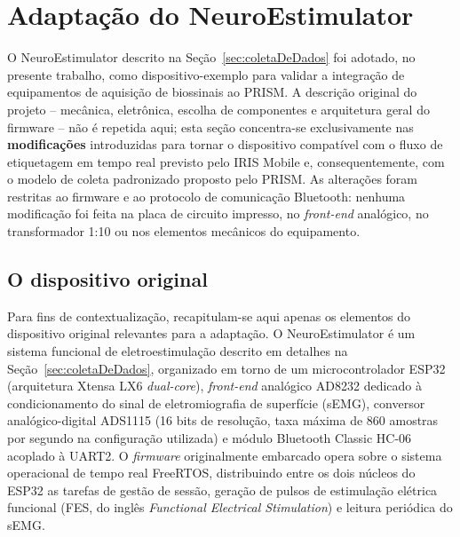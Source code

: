 %   

\section{Adaptação do NeuroEstimulator}\label{sec:adaptacaoNeuroEstimulator}

O NeuroEstimulator descrito na Seção~\ref{sec:coletaDeDados} foi adotado, no presente trabalho, como dispositivo-exemplo para validar a integração de equipamentos de aquisição de biossinais ao PRISM. A descrição original do projeto -- mecânica, eletrônica, escolha de componentes e arquitetura geral do firmware -- não é repetida aqui; esta seção concentra-se exclusivamente nas \textbf{modificações} introduzidas para tornar o dispositivo compatível com o fluxo de etiquetagem em tempo real previsto pelo IRIS Mobile e, consequentemente, com o modelo de coleta padronizado proposto pelo PRISM. As alterações foram restritas ao firmware e ao protocolo de comunicação Bluetooth: nenhuma modificação foi feita na placa de circuito impresso, no \textit{front-end} analógico, no transformador 1:10 ou nos elementos mecânicos do equipamento.

\subsection{O dispositivo original}\label{subsec:NEOriginal}

Para fins de contextualização, recapitulam-se aqui apenas os elementos do dispositivo original relevantes para a adaptação. O NeuroEstimulator é um sistema funcional de eletroestimulação descrito em detalhes na Seção~\ref{sec:coletaDeDados}, organizado em torno de um microcontrolador ESP32 (arquitetura Xtensa LX6 \textit{dual-core}), \textit{front-end} analógico AD8232 dedicado à condicionamento do sinal de eletromiografia de superfície (sEMG), conversor analógico-digital ADS1115 (16 bits de resolução, taxa máxima de 860 amostras por segundo na configuração utilizada) e módulo Bluetooth Classic HC-06 acoplado à UART2. O \textit{firmware} originalmente embarcado opera sobre o sistema operacional de tempo real FreeRTOS, distribuindo entre os dois núcleos do ESP32 as tarefas de gestão de sessão, geração de pulsos de estimulação elétrica funcional (FES, do inglês \textit{Functional Electrical Stimulation}) e leitura periódica do sEMG.

